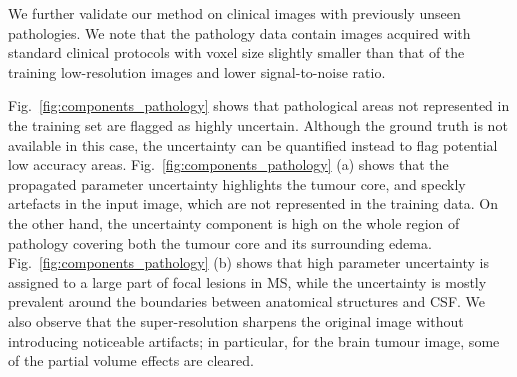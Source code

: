 We further validate our method on clinical images with previously unseen pathologies. We note that the pathology data contain images acquired with standard clinical protocols with voxel size slightly smaller than that of the training low-resolution images and lower signal-to-noise ratio. 


Fig.~\ref{fig:components_pathology} shows that pathological areas not represented in the training set are flagged as highly uncertain. Although the ground truth is not available in this case, the uncertainty can be quantified instead to flag potential low accuracy areas. Fig.~\ref{fig:components_pathology} (a) shows that the propagated parameter uncertainty highlights the tumour core, and speckly artefacts in the input image, which are not represented in the training data. On the other hand, the  uncertainty component is high on the whole region of pathology covering both the tumour core and its surrounding edema. Fig.~\ref{fig:components_pathology} (b) shows that high parameter uncertainty is assigned to a large part of focal lesions in MS, while the  uncertainty is mostly prevalent around the boundaries between anatomical structures and CSF. We also observe that the super-resolution sharpens the original image without introducing noticeable artifacts; in particular, for the brain tumour image, some of the partial volume effects are cleared. 



